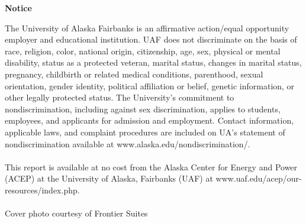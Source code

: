 \newpage
\thispagestyle{empty}
\noindent
{\centering
\bfseries\normalsize Notice
\par
}
\small The University of Alaska Fairbanks is an affirmative action/equal opportunity employer and educational institution. UAF does not discriminate on the basis of race, religion, color, national origin, citizenship, age, sex, physical or mental disability, status as a protected veteran, marital status, changes in marital status, pregnancy, childbirth or related medical conditions, parenthood, sexual orientation, gender identity, political affiliation or belief, genetic information, or other legally protected status. The University's commitment to nondiscrimination, including against sex discrimination, applies to students, employees, and applicants for admission and employment. Contact information, applicable laws, and complaint procedures are included on UA's statement of nondiscrimination available at www.alaska.edu/nondiscrimination/. \\
\\
\small This report is available at no cost from the Alaska Center for Energy and Power (ACEP) at the University of Alaska, Fairbanks (UAF) at www.uaf.edu/acep/our-resources/index.php. \\
\\
\small Cover photo courtesy of Frontier Suites